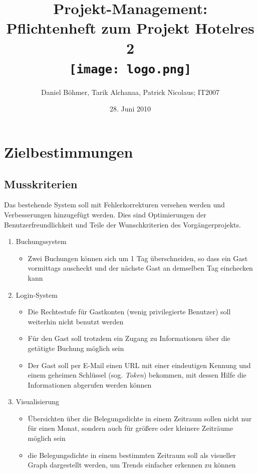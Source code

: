 \documentclass[a4paper,oneside,10pt]{scrreprt}
\author{Daniel Böhmer, Tarik Alchanaa, Patrick Nicolaus; IT2007}
\date{28. Juni 2010}
\title{Projekt-Management:\\Pflichtenheft zum Projekt Hotelres 2 \\
    \vspace{2 cm} \texttt{[image: logo.png]}}
\begin{document}
\maketitle{}

\tableofcontents{}

\sloppy{}


\chapter{Zielbestimmungen}

\section{Musskriterien}

Das bestehende System soll mit Fehlerkorrekturen versehen werden und 
Verbesserungen hinzugefügt werden. Dies sind Optimierungen der 
Benutzerfreundlichkeit und Teile der Wunschkriterien des 
Vorgängerprojekts.

\begin{enumerate}
    \item Buchungssystem
    \begin{itemize}
        \item Zwei Buchungen können sich um 1 Tag überschneiden, so dass 
        ein Gast vormittags auscheckt und der nächste Gast an demselben 
        Tag einchecken kann
    \end{itemize}
    
    \item Login-System
    \begin{itemize}
        \item Die Rechtestufe für Gastkonten (wenig privilegierte 
        Benutzer) soll weiterhin nicht benutzt werden
        \item Für den Gast soll trotzdem ein Zugang zu 
        Informationen über die getätigte Buchung möglich sein
        \item Der Gast soll per E-Mail einen URL mit einer 
        eindeutigen Kennung und einem geheimen Schlüssel (sog. 
        \emph{Token}) bekommen, mit dessen Hilfe die Informationen abgerufen 
        werden können
    \end{itemize}    

    \item Visualisierung
    \begin{itemize}
        \item Übersichten über die Belegungsdichte in einem Zeitraum 
        sollen nicht nur für einen Monat, sondern auch für größere 
        oder kleinere Zeiträume möglich sein
        \item die Belegungsdichte in einem bestimmten Zeitraum soll 
        als visueller Graph dargestellt werden, um Trends einfacher 
        erkennen zu können
    \end{itemize}  

\end{enumerate}
\end{document}
